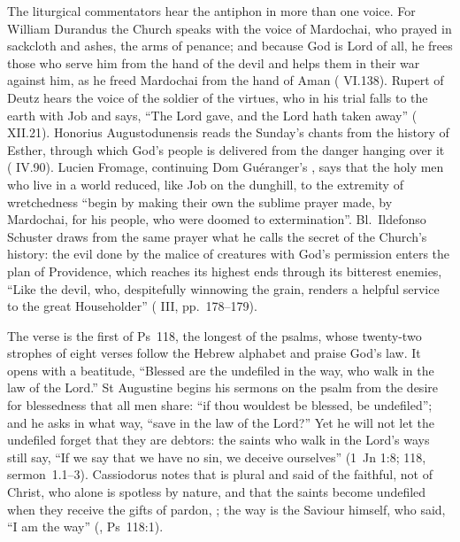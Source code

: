The liturgical commentators hear the antiphon in more than one voice. For
William Durandus the Church speaks with the voice of Mardochai, who prayed in
sackcloth and ashes, the arms of penance; and because God is Lord of all, he
frees those who serve him from the hand of the devil and helps them in their war
against him, as he freed Mardochai from the hand of Aman (
VI.138). Rupert of Deutz hears the voice of the soldier of the virtues, who in
his trial falls to the earth with Job and says, ``The Lord gave, and the Lord
hath taken away'' ( XII.21). Honorius Augustodunensis
reads the Sunday's chants from the history of Esther, through which God's people
is delivered from the danger hanging over it ( IV.90). Lucien
Fromage, continuing Dom Gu\'eranger's , says that the
holy men who live in a world reduced, like Job on the dunghill, to the extremity
of wretchedness ``begin by making their own the sublime prayer made, by
Mardochai, for his people, who were doomed to extermination''. Bl.\ Ildefonso
Schuster draws from the same prayer what he calls the secret of the Church's
history: the evil done by the malice of creatures with God's permission enters
the plan of Providence, which reaches its highest ends through its bitterest
enemies, ``Like the devil, who, despitefully winnowing the grain, renders a
helpful service to the great Householder'' ( III,
pp.~178--179).

The verse is the first of Ps~118, the longest of the psalms, whose
twenty-two strophes of eight verses follow the Hebrew alphabet and praise God's
law. It opens with a beatitude, ``Blessed are the undefiled in the way, who walk
in the law of the Lord.'' St Augustine begins his sermons on the psalm from the
desire for blessedness that all men share: ``if thou wouldest be blessed, be
undefiled''; and he asks in what way, ``save in the law of the Lord?'' Yet he
will not let the undefiled forget that they are debtors: the saints who walk in
the Lord's ways still say, ``If we say that we have no sin, we deceive
ourselves'' (1~Jn 1:8;  118, sermon~1.1--3).
Cassiodorus notes that  is plural and said of the faithful,
not of Christ, who alone is spotless by nature, and that the saints become
undefiled when they receive the gifts of pardon, ; the way is the Saviour himself, who said, ``I am the way''
(, Ps~118:1).

